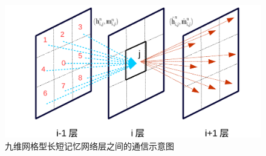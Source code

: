 \begin{figure}
	\centering
	\includegraphics[width=\textwidth]{demo_images/illustration/neighboring.pdf}
	\caption{九维网格型长短记忆网络层之间的通信示意图}
	\label{fig:neighboring}
\end{figure}